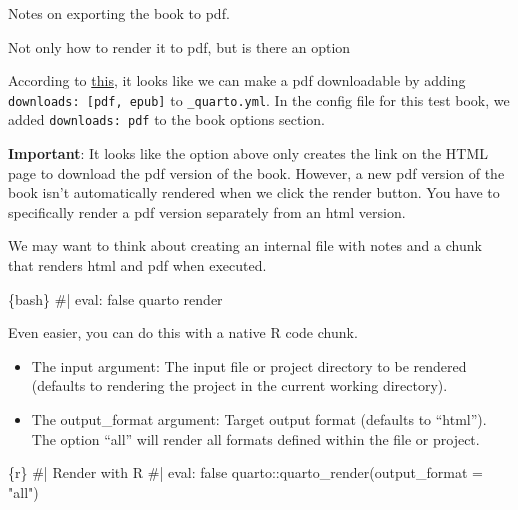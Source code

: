 \documentclass[
  letterpaper,
  DIV=11,
  numbers=noendperiod]{scrreprt}
\newenvironment{Shaded}{\begin{snugshade}}{\end{snugshade}}
\newcommand{\InformationTok}[1]{\textcolor[rgb]{0.37,0.37,0.37}{#1}}
\begin{document}
Notes on exporting the book to pdf.

Not only how to render it to pdf, but is there an option

According to
\href{https://quarto.org/docs/books/book-output.html\#sidebar-tools}{this},
it looks like we can make a pdf downloadable by adding
\texttt{downloads:\ {[}pdf,\ epub{]}} to \texttt{\_quarto.yml}. In the
config file for this test book, we added \texttt{downloads:\ pdf} to the
book options section.

\textbf{Important}: It looks like the option above only creates the link
on the HTML page to download the pdf version of the book. However, a new
pdf version of the book isn't automatically rendered when we click the
render button. You have to specifically render a pdf version separately
from an html version.

We may want to think about creating an internal file with notes and a
chunk that renders html and pdf when executed.

\begin{Shaded}
\begin{Highlighting}[]
\InformationTok{\textasciigrave{}\textasciigrave{}\textasciigrave{}\{bash\}}
\InformationTok{\#| eval: false}
\InformationTok{quarto render}
\InformationTok{\textasciigrave{}\textasciigrave{}\textasciigrave{}}
\end{Highlighting}
\end{Shaded}

Even easier, you can do this with a native R code chunk.

\begin{itemize}
\item
  The input argument: The input file or project directory to be rendered
  (defaults to rendering the project in the current working directory).
\item
  The output\_format argument: Target output format (defaults to
  ``html''). The option ``all'' will render all formats defined within
  the file or project.
\end{itemize}

\begin{Shaded}
\begin{Highlighting}[]
\InformationTok{\textasciigrave{}\textasciigrave{}\textasciigrave{}\{r\}}
\InformationTok{\#| Render with R}
\InformationTok{\#| eval: false}
\InformationTok{quarto::quarto\_render(output\_format = "all")}
\InformationTok{\textasciigrave{}\textasciigrave{}\textasciigrave{}}
\end{Highlighting}
\end{Shaded}
\end{document}
